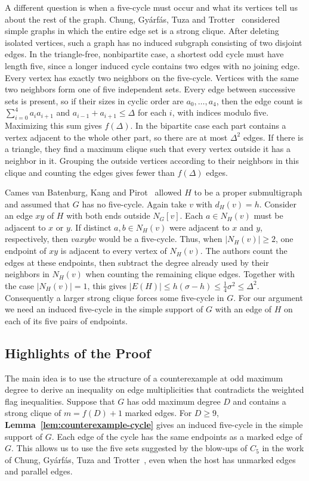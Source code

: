 A different question is when a five-cycle must occur and what its
vertices tell us about the rest of the graph. Chung, Gy\'arf\'as,
Tuza and Trotter~\cite{CGTT1990} considered simple graphs in which
the entire edge set is a strong clique. After deleting isolated
vertices, such a graph has no induced subgraph consisting of two
disjoint edges. In the triangle-free, nonbipartite case, a shortest
odd cycle must have length five, since a longer induced cycle contains
two edges with no joining edge. Every vertex has exactly two neighbors
on the five-cycle. Vertices with the same two neighbors form one of
five independent sets. Every edge between successive sets is present,
so if their sizes in cyclic
order are $a_0,\ldots,a_4$, then the edge count is
$\sum_{i=0}^4 a_i a_{i+1}$ and $a_{i-1}+a_{i+1}\leq\Delta$ for
each $i$, with indices modulo five. Maximizing this sum gives
$f(\Delta)$. In the bipartite case each part contains a vertex
adjacent to the whole other part, so there are at most $\Delta^2$
edges. If there is a triangle, they find a maximum clique such that
every vertex outside it has a neighbor in it. Grouping the outside
vertices according to their neighbors in this clique and counting
the edges gives fewer than $f(\Delta)$ edges.

Cames van Batenburg, Kang and Pirot~\cite{CamesKangPirot2020}
allowed $H$ to be a proper submultigraph and assumed that $G$ has
no five-cycle. Again take $v$ with $d_H(v)=h$. Consider an edge
$xy$ of $H$ with both ends outside $N_G[v]$. Each $a\in N_H(v)$
must be adjacent to $x$ or $y$. If distinct $a,b\in N_H(v)$
were adjacent to $x$ and $y$, respectively, then $vaxybv$ would
be a five-cycle. Thus, when $|N_H(v)|\geq2$, one endpoint of $xy$
is adjacent to every vertex of $N_H(v)$. The authors count the
edges at these endpoints, then subtract the degree already used by
their neighbors in $N_H(v)$ when counting the remaining clique edges.
Together with the case $|N_H(v)|=1$, this gives
$|E(H)|\leq h(\sigma-h)\leq\frac{1}{4}\sigma^2\leq\Delta^2$.
Consequently a larger strong clique forces some five-cycle in $G$.
For our argument we need an induced five-cycle in the simple support
of $G$ with an edge of $H$ on each of its five pairs of endpoints.

\subsection{Highlights of the Proof}\label{subsec:method-highlights}

The main idea is to use the structure of a counterexample at odd
maximum degree to derive an inequality on edge multiplicities that
contradicts the weighted flag inequalities. Suppose that $G$ has odd
maximum degree $D$ and contains a strong clique of $m=f(D)+1$ marked edges.
For $D\geq9$, \textbf{Lemma~\ref{lem:counterexample-cycle}} gives an
induced five-cycle in the simple support of $G$. Each edge of the cycle
has the same endpoints as a marked edge of $G$. This allows us to
use the five sets suggested by the blow-ups of $C_5$ in the work
of Chung, Gy\'arf\'as, Tuza and Trotter~\cite{CGTT1990}, even when
the host has unmarked edges and parallel edges.

